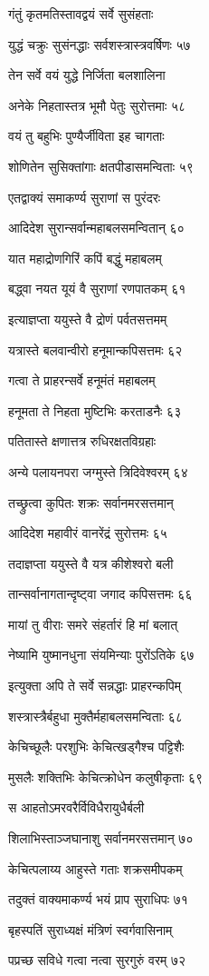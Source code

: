 गंतुं कृतमतिस्तावद्वयं सर्वे सुसंहताः

युद्धं चक्रुः सुसंनद्धाः सर्वशस्त्रास्त्रवर्षिणः ५७

तेन सर्वे वयं युद्धे निर्जिता बलशालिना

अनेके निहतास्तत्र भूमौ पेतुः सुरोत्तमाः ५८

वयं तु बहुभिः पुण्यैर्जीविता इह चागताः

शोणितेन सुसिक्तांगाः क्षतपीडासमन्विताः ५९

एतद्वाक्यं समाकर्ण्य सुराणां स पुरंदरः

आदिदेश सुरान्सर्वान्महाबलसमन्वितान् ६०

यात महाद्रोणगिरिं कपिं बद्धुं महाबलम्

बद्ध्वा नयत यूयं वै सुराणां रणपातकम् ६१

इत्याज्ञप्ता ययुस्ते वै द्रोणं पर्वतसत्तमम्

यत्रास्ते बलवान्वीरो हनूमान्कपिसत्तमः ६२

गत्वा ते प्राहरन्सर्वे हनूमंतं महाबलम्

हनूमता ते निहता मुष्टिभिः करताडनैः ६३

पतितास्ते क्षणात्तत्र रुधिरक्षतविग्रहाः

अन्ये पलायनपरा जग्मुस्ते त्रिदिवेश्वरम् ६४

तच्छ्रुत्वा कुपितः शक्रः सर्वानमरसत्तमान्

आदिदेश महावीरं वानरेंद्रं सुरोत्तमः ६५

तदाज्ञप्ता ययुस्ते वै यत्र कीशेश्वरो बली

तान्सर्वानागतान्दृष्ट्वा जगाद कपिसत्तमः ६६

मायां तु वीराः समरे संहर्तारं हि मां बलात्

नेष्यामि युष्मानधुना संयमिन्याः पुरोंऽतिके ६७

इत्युक्ता अपि ते सर्वे सन्नद्धाः प्राहरन्कपिम्

शस्त्रास्त्रैर्बहुधा मुक्तैर्महाबलसमन्विताः ६८

केचिच्छूलैः परशुभिः केचित्खड्गैश्च पट्टिशैः

मुसलैः शक्तिभिः केचित्क्रोधेन कलुषीकृताः ६९

स आहतोऽमरवरैर्विविधैरायुधैर्बली

शिलाभिस्ताञ्जघानाशु सर्वानमरसत्तमान् ७०

केचित्पलाय्य आहुस्ते गताः शक्रसमीपकम्

तदुक्तं वाक्यमाकर्ण्य भयं प्राप सुराधिपः ७१

बृहस्पतिं सुराध्यक्षं मंत्रिणं स्वर्गवासिनाम्

पप्रच्छ सविधे गत्वा नत्वा सुरगुरुं वरम् ७२


